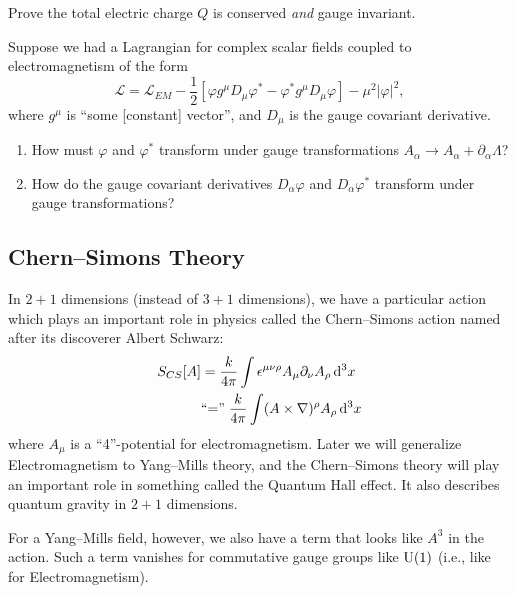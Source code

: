 \begin{exercise}
Prove the total electric charge $Q$ is conserved \emph{and} gauge invariant.
\end{exercise}

\begin{exercise}
Suppose we had a Lagrangian for complex scalar fields coupled to
electromagnetism of the form
\begin{equation}
\mathcal{L}=\mathcal{L}_{EM}-\frac{1}{2}[\varphi g^{\mu}D_{\mu}\varphi^{*}-\varphi^{*}g^{\mu}D_{\mu}\varphi]-\mu^{2}|\varphi|^{2},
\end{equation}
where $g^{\mu}$ is ``some [constant] vector'', and $D_{\mu}$ is the
gauge covariant derivative.
\begin{enumerate}
\item How must $\varphi$ and $\varphi^{*}$ transform under gauge
  transformations $A_{\alpha}\to A_{\alpha}+\partial_{\alpha}\Lambda$?
\item How do the gauge covariant derivatives $D_{\alpha}\varphi$ and
  $D_{\alpha}\varphi^{*}$ transform under gauge transformations?
\end{enumerate}
\end{exercise}

\subsection{Chern--Simons Theory}

\M
In $2+1$ dimensions (instead of $3+1$ dimensions), we have a particular
action which plays an important role in physics called the Chern--Simons
action named after its discoverer Albert Schwarz:
\begin{equation}
\begin{split}
  S_{CS}[A] &= \frac{k}{4\pi}\int\epsilon^{\mu\nu\rho}A_{\mu}\partial_{\nu}A_{\rho}\,\mathrm{d}^{3}x\\
&\mbox{``=''}\; \frac{k}{4\pi}\int(A\times\nabla)^{\rho} A_{\rho}\,\mathrm{d}^{3}x
\end{split}
\end{equation}
where $A_{\mu}$ is a ``4''-potential for electromagnetism. Later we will
generalize Electromagnetism to Yang--Mills theory, and the Chern--Simons
theory will play an important role in something called the Quantum Hall
effect. It also describes quantum gravity in $2+1$ dimensions.

For a Yang--Mills field, however, we also have a term that looks like
$A^{3}$ in the action. Such a term vanishes for commutative gauge groups
like $\operatorname{U}(1)$ (i.e., like for Electromagnetism).

